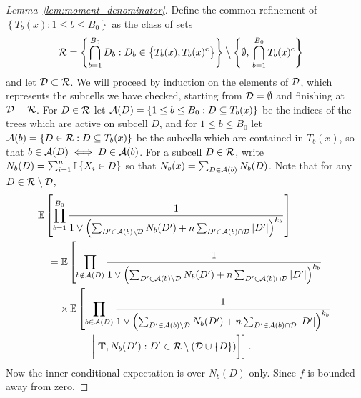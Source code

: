 \begin{proof}[Lemma~\ref{lem:moment_denominator}]

  Define the common refinement of
  $\left\{ T_b(x) : 1 \leq b \leq {B_0} \right\}$ as
  the class of sets
  \begin{align*}
    \mathcal{R}
    &= \left\{ \bigcap_{b=1}^{{B_0}} D_b :
      D_b \in
      \big\{ T_b(x), T_b(x)^{\mathrm{c}} \big\}
    \right\}
    \mathbin{\big\backslash}
    \left\{
      \emptyset,\,
      \bigcap_{b=1}^{{B_0}}
      T_b(x)^{\mathrm{c}}
    \right\}
  \end{align*}
  and let $\mathcal{D} \subset \mathcal{R}$.
  We will proceed by induction on the elements of $\mathcal{D}$,
  which represents the subcells we have checked,
  starting from $\mathcal{D} = \emptyset$ and finishing at $\mathcal{D} = \mathcal{R}$.
  For $D \in \mathcal{R}$ let
  $\mathcal{A}(D) = \left\{ 1 \leq b \leq {B_0} : D \subseteq T_b(x) \right\}$
  be the indices of the trees which are active on subcell $D$,
  and for $1 \leq b \leq {B_0}$ let
  $\mathcal{A}(b) = \left\{ D \in \mathcal{R} : D \subseteq T_b(x) \right\}$
  be the subcells which are contained in $T_b(x)$,
  so that $b \in \mathcal{A}(D) \iff D \in \mathcal{A}(b)$.
  For a subcell $D \in \mathcal{R}$,
  write $N_b(D) = \sum_{i=1}^{n} \mathbb{I} \left\{ X_i \in D \right\}$
  so that $N_b(x) = \sum_{D \in \mathcal{A}(b)} N_b(D)$.
  Note that for any $D \in \mathcal{R} \setminus \mathcal{D}$,
  \begin{align*}
    &\mathbb{E} \left[
      \prod_{b=1}^{B_0}
      \frac{1}{
        1 \vee \left(
          \sum_{D' \in \mathcal{A}(b) \setminus \mathcal{D}}
          N_b(D')
          + n \sum_{D' \in \mathcal{A}(b) \cap \mathcal{D}}
          |D'|
        \right)^{k_b}
      }
    \right] \\
    &\quad=
    \mathbb{E} \left[
      \prod_{b \notin \mathcal{A}(D)}
      \frac{1}{
        1 \vee \left(
          \sum_{D' \in \mathcal{A}(b) \setminus \mathcal{D}}
          N_b(D')
          + n \sum_{D' \in \mathcal{A}(b) \cap \mathcal{D}}
          |D'|
        \right)^{k_b}
      } \right. \\
      &\left.
      \qquad
      \times\,\mathbb{E}\left[
        \prod_{b \in \mathcal{A}(D)}
        \frac{1}{
          1 \vee \left(
            \sum_{D' \in \mathcal{A}(b) \setminus \mathcal{D}}
            N_b(D')
            + n \sum_{D' \in \mathcal{A}(b) \cap \mathcal{D}}
            |D'|
          \right)^{k_b}
        } \right.\right. \\
        &\left.\left.
        \quad\qquad\qquad\biggm|
        \mathbf{T},
        N_b(D') : D' \in \mathcal{R}
        \setminus
        (\mathcal{D} \cup \{D\})
      \right]
    \right].
  \end{align*}
  Now the inner conditional expectation is over $N_b(D)$ only.
  Since $f$ is bounded away from zero,

\end{proof}
